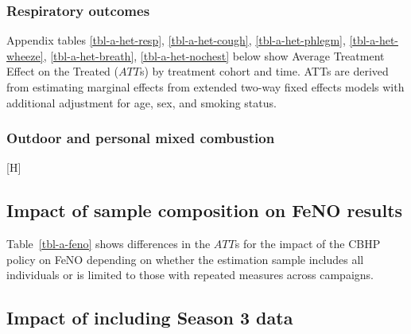 \documentclass[
  letterpaper,
  DIV=11,
  numbers=noendperiod]{scrartcl}
\makeatletter
\renewenvironment{figure}%
   {\renewcommand\familydefault\sfdefault
    \@float{figure}}
   {\end@float}
\makeatother
\begin{document}
\subsubsection{Respiratory outcomes}\label{respiratory-outcomes}

Appendix tables \ref{tbl-a-het-resp}, \ref{tbl-a-het-cough},
\ref{tbl-a-het-phlegm}, \ref{tbl-a-het-wheeze}, \ref{tbl-a-het-breath},
\ref{tbl-a-het-nochest} below show Average Treatment Effect on the
Treated (\(ATT\)s) by treatment cohort and time. ATTs are derived from
estimating marginal effects from extended two-way fixed effects models
with additional adjustment for age, sex, and smoking status.

\newpage

\subsubsection{Outdoor and personal mixed
combustion}\label{outdoor-and-personal-mixed-combustion}

\begin{figure}[H]


\caption{\label{fig-afig-mixed-ct}Adjusted and unadjusted treatment
effect for outdoor and personal exposure (µg/m\textsuperscript{3}) to
the mixed combustion source by treatment year.}

\end{figure}%

\newpage

\subsection{Impact of sample composition on FeNO
results}\label{impact-of-sample-composition-on-feno-results}

Table~\ref{tbl-a-feno} shows differences in the \(ATT\)s for the impact
of the CBHP policy on FeNO depending on whether the estimation sample
includes all individuals or is limited to those with repeated measures
across campaigns.

\newpage

\subsection{Impact of including Season 3
data}\label{impact-of-including-season-3-data}
\end{document}
